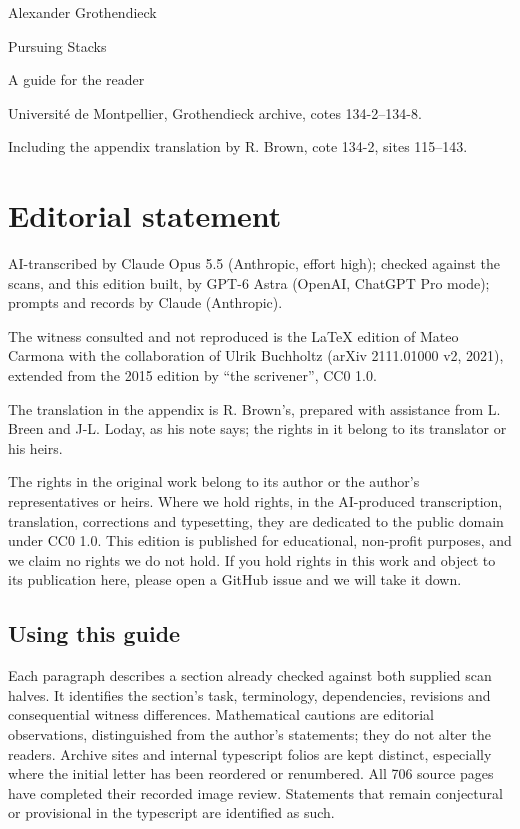 \documentclass[10pt,oneside]{book}
\begin{document}
\hypersetup{pageanchor=false}
\begin{titlepage}\raggedright
{\Large Alexander Grothendieck\par}\vspace{12mm}
{\Huge Pursuing Stacks\par}\medskip{\LARGE 1983\par}\vspace{12mm}
{\Large A guide for the reader\par}\vspace{8mm}
{\large\EditionStatus\par}\vfill
Université de Montpellier, Grothendieck archive, cotes 134-2--134-8.\par
Including the appendix translation by R. Brown, cote 134-2, sites 115--143.\par
\vspace*{2mm}\end{titlepage}\hypersetup{pageanchor=true}
\chapter*{Editorial statement}

AI-transcribed by Claude Opus 5.5 (Anthropic, effort high); checked against the scans, and this edition built, by GPT-6 Astra (OpenAI, ChatGPT Pro mode); prompts and records by Claude (Anthropic).

The witness consulted and not reproduced is the LaTeX edition of Mateo Carmona with the collaboration of Ulrik Buchholtz (arXiv 2111.01000 v2, 2021), extended from the 2015 edition by ``the scrivener'', CC0 1.0.

The translation in the appendix is R. Brown's, prepared with assistance from L. Breen and J-L. Loday, as his note says; the rights in it belong to its translator or his heirs.

The rights in the original work belong to its author or the author's representatives or heirs. Where we hold rights, in the AI-produced transcription, translation, corrections and typesetting, they are dedicated to the public domain under CC0 1.0. This edition is published for educational, non-profit purposes, and we claim no rights we do not hold. If you hold rights in this work and object to its publication here, please open a GitHub issue and we will take it down.


\section*{Using this guide}
Each paragraph describes a section already checked against both supplied scan halves. It identifies the section's task, terminology, dependencies, revisions and consequential witness differences. Mathematical cautions are editorial observations, distinguished from the author's statements; they do not alter the readers. Archive sites and internal typescript folios are kept distinct, especially where the initial letter has been reordered or renumbered. All 706 source pages have completed their recorded image review. Statements that remain conjectural or provisional in the typescript are identified as such.
\end{document}
